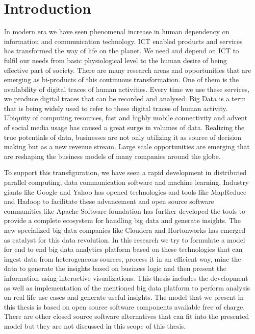 \chapter{Introduction}
\label{chapter:intro}

 In modern era we have seen phenomenal increase in human dependency on information and communication technology. ICT enabled products and services has transformed the way of life on the planet. We need and depend on ICT to fulfil our needs from basic physiological level to the human desire of being effective part of society. There are many research areas and opportunities that are emerging as bi-products of this continuous transformation. One of them is the availability of digital traces of human activities. Every time we use these services, we produce digital traces that can be recorded and analysed. Big Data is a term that is being widely used to refer to these digital traces of human activity. Ubiquity of computing resources, fast and highly mobile connectivity and advent of social media usage has caused a great surge in volumes of data. Realizing the true potentials of data, businesses are not only utilizing it as source of decision making but as a new revenue stream. Large scale opportunities are emerging that are reshaping the business models of many companies around the globe.
 
To support this transfiguration, we have seen a rapid development in distributed parallel computing, data communication software and machine learning. Industry giants like Google and Yahoo has opened technologies and tools like MapReduce and Hadoop to facilitate these advancement and open source software communities like Apache Software foundation has further developed the tools to provide a complete ecosystem for handling big data and generate insights. The new specialized big data companies like Cloudera and Hortonworks has emerged as catalyst for this data revolution. In this research we try to formulate a model for end to end big data analytics platform based on these technologies that can ingest data from heterogeneous sources, process it in an efficient way, mine the data to generate the insights based on business logic and then present the information using interactive visualizations. This thesis includes the development as well as implementation of the mentioned big data platform to perform analysis on real life use cases and generate useful insights. The model that we present in this thesis is based on open source software components available free of charge. There are other closed source software alternatives that can fit into the presented model but they are not discussed in this scope of this thesis.


